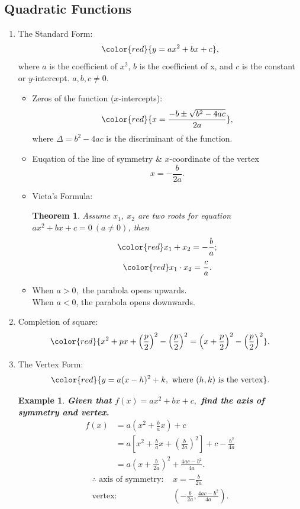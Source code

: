 \documentclass[12pt, a4paper]{article}
\newtheorem{theorem}{Theorem}[subsection]
\newtheorem{example}{Example}[subsection]
\begin{document}
\subsection{Quadratic Functions}
\begin{enumerate}
    \item The Standard Form: 
    $$\color{red}{y=ax^2+bx+c},$$
    where $a$ is the coefficient of $x^2$, $b$ is the coefficient of x, and $c$ is the constant or $y$-intercept. $a,b,c\neq 0$. 
    \begin{itemize}
        \item Zeros of the function ($x$-intercepts): 
        $$\color{red}{x=\frac{-b\pm\sqrt{b^2-4ac}}{2a}},$$
        where $\Delta=b^2-4ac$ is the discriminant of the function. 
        \item Euqation of the line of symmetry \& $x$-coordinate of the vertex
        $$x=-\frac{b}{2a}.$$
        \item Vieta's Formula: 
        \begin{theorem}
            Assume $x_1,\ x_2$ are two roots for equation $ax^2+bx+c=0\ (a\neq 0)$, then
            $$\color{red}x_1+x_2=-\frac{b}{a};$$
            $$\color{red}x_1\cdot x_2=\frac{c}{a}.$$
        \end{theorem}
        \item When $a>0,$ the parabola opens upwards. \\
        When $a<0$, the parabola opens downwards.
    \end{itemize}
    \item Completion of square: 
    $${\color{red}{x^2+px+\left(\frac{p}{2}\right)^2-\left(\frac{p}{2}\right)^2=\left(x+\frac{p}{2}\right)^2-\left(\frac{p}{2}\right)^2}}.$$
    \item The Vertex Form: 
    $${\color{red}{y=a(x-h)^2+k,\text{ where }(h,k)\text{ is the vertex}}}.$$
    \begin{example}
        \textbf{Given that $f(x)=ax^2+bx+c,$ find the axis of symmetry and vertex.}
        $$\begin{aligned}
            f(x)&=a\left(x^2+\frac{b}{a}x\right)+c\\
            &=a\left[x^2+\frac{b}{a}x+\left(\frac{b}{2a}\right)^2\right]+c-\frac{b^2}{4a}\\
            &=a\left(x+\frac{b}{2a}\right)^2+\frac{4ac-b^2}{4a}.
        \end{aligned}$$
        $$\begin{aligned}
            \therefore \text{ axis of symmetry: }&x=-\frac{b}{2a}\\
            \text{vertex: }&\left(-\frac{b}{2a},\frac{4ac-b^2}{4a}\right).
        \end{aligned}$$
    \end{example}
\end{enumerate}
\end{document}
